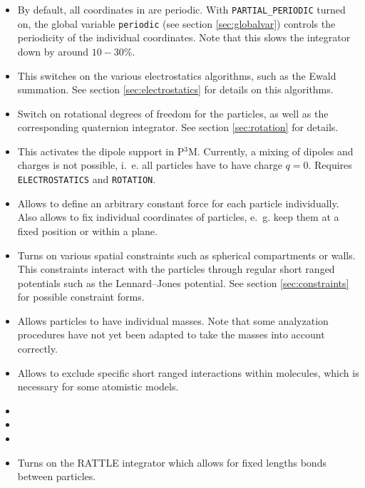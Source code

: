 \begin{itemize}
\item {} By default, all coordinates in \es{}
  are periodic. With \texttt{PARTIAL\_PERIODIC} turned on, the \es{}
  global variable \texttt{periodic} (see section \vref{sec:globalvar})
  controls the periodicity of the individual coordinates. Note that
  this slows the integrator down by around $10-30\%$.
\item {} This switches on the various
  electrostatics algorithms, such as the Ewald summation. See section
  \vref{sec:electrostatics} for details on this algorithms.
\item {} Switch on rotational degrees of freedom for
  the particles, as well as the corresponding quaternion integrator.
  See section \vref{sec:rotation} for details.
\item {} This activates the dipole support in P$^3$M.
  Currently, a mixing of dipoles and charges is not possible, i.~e.
  all particles have to have charge $q=0$.  Requires
  \texttt{ELECTROSTATICS} and \texttt{ROTATION}.
\item {} Allows to define an arbitrary
  constant force for each particle individually. Also allows to fix
  individual coordinates of particles, e.~g. keep them at a fixed
  position or within a plane.
\item {} Turns on various spatial constraints such
  as spherical compartments or walls. This constraints interact with
  the particles through regular short ranged potentials such as the
  Lennard--Jones potential. See section \vref{sec:constraints} for
  possible constraint forms.
\item {} Allows particles to have individual masses. Note
  that some analyzation procedures have not yet been adapted to take
  the masses into account correctly.
\item {} Allows to exclude specific short ranged
  interactions within molecules, which is necessary for some atomistic
  models.
\item {}
\item {}
\item {}
\item {} Turns on the RATTLE integrator which
  allows for fixed lengths bonds between particles.
\end{itemize}

